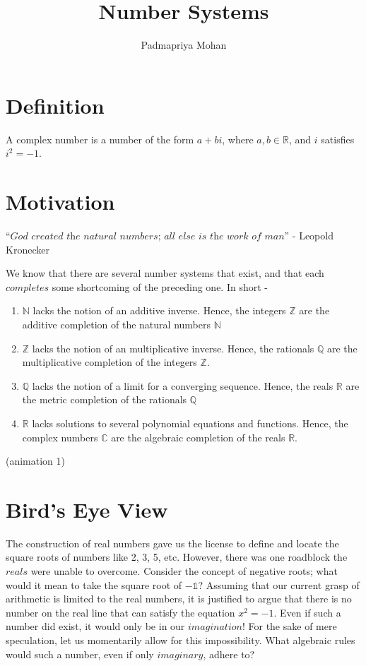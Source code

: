 \documentclass[final,3p]{CSP}
\begin{document}
\begin{frontmatter}

\title{Number Systems}
\author{Padmapriya Mohan}

\end{frontmatter}
\section{Definition}
A complex number is a number of the form $a + bi$, where $a,b \in \mathbb{R}$, and $i$ satisfies $i^{2}=-1$.


\section{Motivation}
 $\textit{“God created the natural numbers; all else is the work of man”}$ - Leopold Kronecker \par

We know that there are several number systems that exist, and that each $completes$ some shortcoming of the preceding one. In short -   
\begin{enumerate}
\item $\mathbb{N}$ lacks the notion of an additive inverse. Hence, the integers $\mathbb{Z}$ are the additive completion of the natural numbers $\mathbb{N}$ 
\item $\mathbb{Z}$ lacks the notion of an multiplicative inverse. Hence, the rationals $\mathbb{Q}$ are the multiplicative completion of the integers $\mathbb{Z}$.
\item $\mathbb{Q}$ lacks the notion of a limit for a converging sequence. Hence, the reals $\mathbb{R}$ are the metric completion of the rationals $\mathbb{Q}$ 
\item $\mathbb{R}$ lacks solutions to several polynomial equations and functions. Hence, the complex numbers $\mathbb{C}$ are the algebraic completion of the reals $\mathbb{R}$. 
\end{enumerate}

(animation 1)

\section{Bird's Eye View}

\noindent
The construction of real numbers gave us the license to define and locate the square roots of numbers like 2, 3, 5, etc.  However, there was one roadblock the $\textit{reals}$ were unable to overcome. Consider the concept of negative roots; what would it mean to take the square root of $\mathbb{-1}$? Assuming that our current grasp of arithmetic is limited to the real numbers, it is justified to argue that there is no number on the real line that can satisfy the equation $x^{2} = -1$. Even if such a number did exist, it would only be in our $\textit{imagination}$! For the sake of mere speculation, let us momentarily allow for this impossibility. What algebraic rules would such a number, even if only $\textit{imaginary}$, adhere to?
\end{document}
